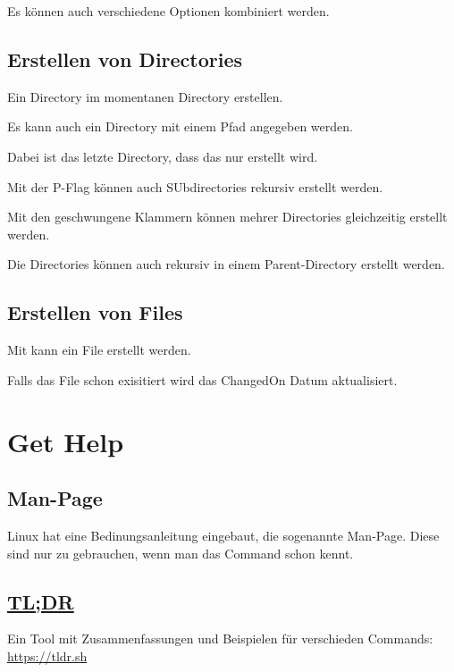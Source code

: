 \documentclass{article}
\begin{document}
Es können auch verschiedene Optionen kombiniert werden.


\subsection{Erstellen von Directories}

Ein Directory im momentanen Directory erstellen.

Es kann auch ein Directory mit einem Pfad angegeben werden.

Dabei ist das letzte Directory, dass das nur erstellt wird.

Mit der P-Flag können auch SUbdirectories rekursiv erstellt werden.

Mit den geschwungene Klammern können mehrer Directories gleichzeitig erstellt werden.

Die Directories können auch rekursiv in einem Parent-Directory erstellt werden.

\subsection{Erstellen von Files}

Mit  kann ein File erstellt werden.

Falls das File schon exisitiert wird das ChangedOn Datum aktualisiert.

\section*{Get Help}
\subsection*{Man-Page}
Linux hat eine Bedinungsanleitung eingebaut, die sogenannte Man-Page.
Diese sind nur zu gebrauchen, wenn man das Command schon kennt.

\subsection*{\href{https://tldr.sh/}{TL;DR}}
Ein Tool mit Zusammenfassungen und Beispielen für verschieden Commands: \href{https://tldr.sh/}{https://tldr.sh}
\end{document}
